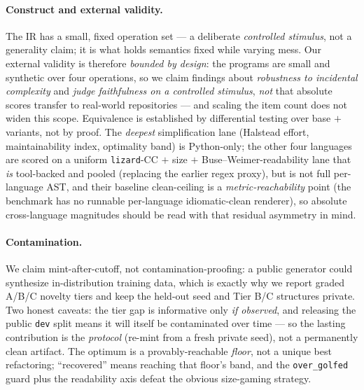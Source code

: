 \documentclass[11pt]{article}
\begin{document}
\paragraph{Construct and external validity.} The IR has a small, fixed operation set ---
a deliberate \emph{controlled stimulus}, not a generality claim; it is what holds semantics
fixed while varying mess. Our external validity is therefore \emph{bounded by design}: the
programs are small and synthetic over four operations, so we claim findings about
\emph{robustness to incidental complexity} and \emph{judge faithfulness on a controlled
stimulus}, \emph{not} that absolute scores transfer to real-world repositories --- and
scaling the item count does not widen this scope. Equivalence is established by differential
testing over base $+$ variants, not by proof. The \emph{deepest} simplification lane
(Halstead effort, maintainability index, optimality band) is Python-only; the other four
languages are scored on a uniform \texttt{lizard}-CC $+$ size $+$ Buse--Weimer-readability
lane that \emph{is} tool-backed and pooled (replacing the earlier regex proxy), but is not
full per-language AST, and their baseline clean-ceiling is a \emph{metric-reachability}
point (the benchmark has no runnable per-language idiomatic-clean renderer), so absolute
cross-language magnitudes should be read with that residual asymmetry in mind.
\paragraph{Contamination.} We claim mint-after-cutoff, not contamination-proofing: a public
generator could synthesize in-distribution training data, which is exactly why we report
graded A/B/C novelty tiers and keep the held-out seed and Tier B/C structures private. Two
honest caveats: the tier gap is informative only \emph{if observed}, and releasing the
public \texttt{dev} split means it will itself be contaminated over time --- so the lasting
contribution is the \emph{protocol} (re-mint from a fresh private seed), not a permanently
clean artifact. The optimum is a provably-reachable \emph{floor}, not a unique best
refactoring; ``recovered'' means reaching that floor's band, and the \texttt{over\_golfed}
guard plus the readability axis defeat the obvious size-gaming strategy.
\end{document}
